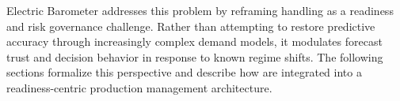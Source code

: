 Electric Barometer addresses this problem by reframing \LTO{} handling as a readiness and risk
governance challenge. Rather than attempting to restore predictive accuracy through increasingly
complex demand models, it modulates forecast trust and decision behavior in response to known
regime shifts. The following sections formalize this perspective and describe how \LTOs{} are
integrated into a readiness-centric production management architecture.
